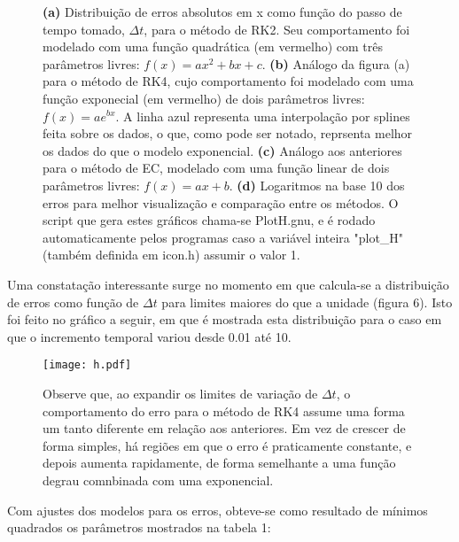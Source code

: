 \documentclass[a4paper, brazilian, 8pt, final]{article}
\begin{document}
\begin{figure}[!h]
\centering
{}
\caption{\textbf{(a)} Distribuição de erros absolutos em x como função do passo de tempo tomado, $\Delta t$, para o método de RK2. Seu comportamento foi modelado com uma função quadrática (em vermelho) com três parâmetros livres: $f(x) = ax^{2} + bx + c$. \textbf{(b)} Análogo da figura (a) para o método de RK4, cujo comportamento foi modelado com uma função exponecial (em vermelho) de dois parâmetros livres: $f(x) = ae^{bx}$. A linha azul representa uma interpolação por splines feita sobre os dados, o que, como pode ser notado, reprsenta melhor os dados do que o modelo exponencial. \textbf{(c)} Análogo aos anteriores para o método de EC, modelado com uma função linear de dois parâmetros livres: $f(x) = ax + b$. \textbf{(d)} Logaritmos na base 10 dos erros para melhor visualização e comparação entre os métodos. O script que gera estes gráficos chama-se PlotH.gnu, e é rodado automaticamente pelos programas caso a variável inteira "plot\_H" (também definida em icon.h) assumir o valor 1.}
\end{figure}

\begin{multicols}{2}
\quad Uma constatação interessante surge no momento em que calcula-se a distribuição de erros como função de $\Delta t$ para limites maiores do que a unidade (figura 6). Isto foi feito no gráfico a seguir, em que é mostrada esta distribuição para o caso em que o incremento temporal variou desde 0.01 até 10.
\end{multicols}

\begin{figure}[!h]
\centering
\texttt{[image: h.pdf]}
\caption{Observe que, ao expandir os limites de variação de $\Delta t$, o comportamento do erro para o método de RK4 assume uma forma um tanto diferente em relação aos anteriores. Em vez de crescer de forma simples, há regiões em que o erro é praticamente constante, e depois aumenta rapidamente, de forma semelhante a uma função degrau comnbinada com uma exponencial.}
\end{figure}

\begin{multicols}{2}
\quad Com ajustes dos modelos para os erros, obteve-se como resultado de mínimos quadrados os parâmetros mostrados na tabela 1:
\end{multicols}
\end{document}
